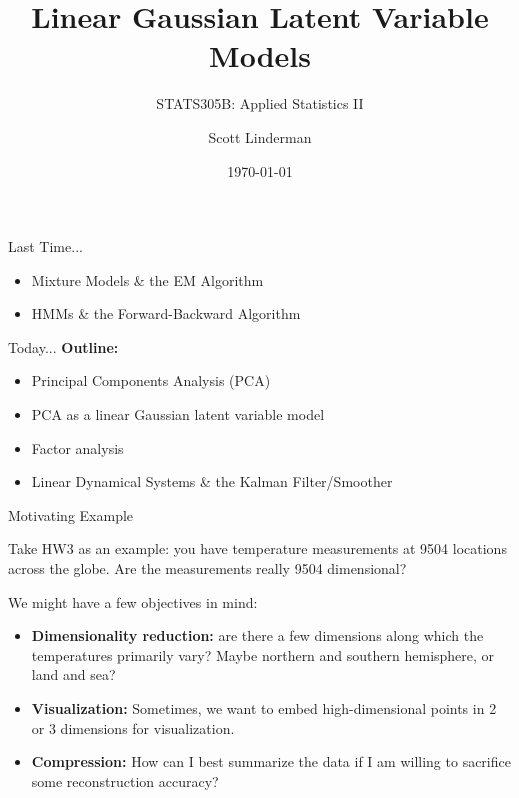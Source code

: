 \documentclass[aspectratio=169]{beamer}
\title{Linear Gaussian Latent Variable Models}
\subtitle{STATS305B: Applied  Statistics II}
\author{Scott Linderman}
\date{\today}
\begin{document}
\maketitle

\begin{frame}{Last Time...}
    \begin{itemize}
        \item Mixture Models \& the EM Algorithm
        \item HMMs \& the Forward-Backward Algorithm
    \end{itemize}
\end{frame}

\begin{frame}{Today...}
    \textbf{Outline:}
    \begin{itemize}
        \item Principal Components Analysis (PCA)
        \item PCA as a linear Gaussian latent variable model
        \item Factor analysis
        \item Linear Dynamical Systems \& the Kalman Filter/Smoother
    \end{itemize}
    \vspace{1em}
\end{frame}

\begin{frame}[t]{Motivating Example}
    
Take HW3 as an example: you have temperature measurements at 9504 locations across the globe. Are the measurements really 9504 dimensional?

We might have a few objectives in mind:
\begin{itemize}
    \item \textbf{Dimensionality reduction:} are there a few dimensions along which the temperatures primarily vary? Maybe northern and southern hemisphere, or land and sea?
    
    \item \textbf{Visualization:} Sometimes, we want to embed high-dimensional points in 2 or 3 dimensions for visualization.
    
    \item \textbf{Compression:} How can I best summarize the data if I am willing to sacrifice some reconstruction accuracy?
\end{itemize}

\end{frame}
\end{document}

